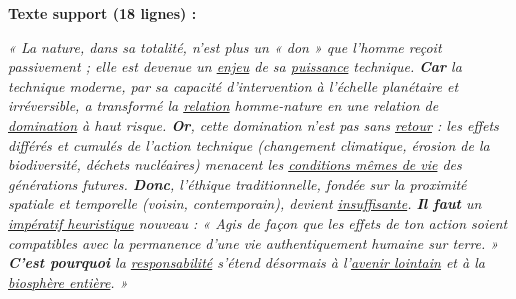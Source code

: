 \documentclass[11pt]{article}
\begin{document}
\vspace{0.5cm}
\noindent \textbf{Texte support (18 lignes) :}

\emph{« La nature, dans sa totalité, n'est plus un « don » que l'homme reçoit passivement ; elle est devenue un \underline{enjeu} de sa \underline{puissance} technique. \textbf{Car} la technique moderne, par sa capacité d'intervention à l'échelle planétaire et irréversible, a transformé la \underline{relation} homme-nature en une relation de \underline{domination} à haut risque. \textbf{Or}, cette domination n'est pas sans \underline{retour} : les effets différés et cumulés de l'action technique (changement climatique, érosion de la biodiversité, déchets nucléaires) menacent les \underline{conditions mêmes de vie} des générations futures. \textbf{Donc}, l'éthique traditionnelle, fondée sur la proximité spatiale et temporelle (voisin, contemporain), devient \underline{insuffisante}. \textbf{Il faut} un \underline{impératif heuristique} nouveau : « Agis de façon que les effets de ton action soient compatibles avec la permanence d'une vie authentiquement humaine sur terre. » \textbf{C'est pourquoi} la \underline{responsabilité} s'étend désormais à l'\underline{avenir lointain} et à la \underline{biosphère entière}. »}
\end{document}
